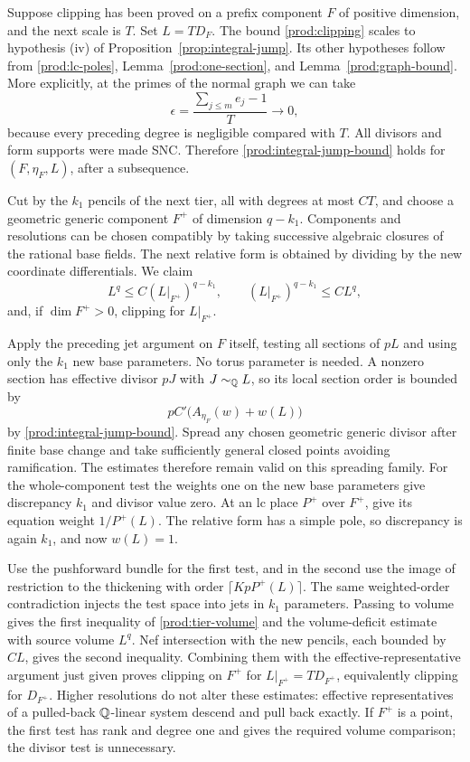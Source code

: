 Suppose clipping has been proved on a prefix component $F$ of positive
dimension, and the next scale is $T$.  Set $L=TD_F$.  The bound
\eqref{prod:clipping} scales to hypothesis (iv) of
Proposition~\ref{prop:integral-jump}.  Its other hypotheses follow from
\eqref{prod:lc-poles}, Lemma~\ref{prod:one-section}, and
Lemma~\ref{prod:graph-bound}.  More explicitly, at the primes of the
normal graph we can take
\[
 \epsilon=\frac{\sum_{j\leq m}e_j-1}{T}\longrightarrow0,
\]
because every preceding degree is negligible compared with $T$.
All divisors and form supports were made SNC.  Therefore
\eqref{prod:integral-jump-bound} holds for $(F,\eta_F,L)$, after a
subsequence.

Cut by the $k_1$ pencils of the next tier, all with degrees at most
$CT$, and choose a geometric generic component $F^+$ of dimension
$q-k_1$.  Components and resolutions can be chosen compatibly by
taking successive algebraic closures of the rational base fields.
The next relative form is obtained by dividing by the new coordinate
differentials.  We claim
\begin{equation}\label{prod:tier-volume}
 L^q\leq C(L|_{F^+})^{q-k_1},\qquad
 (L|_{F^+})^{q-k_1}\leq CL^q,
\end{equation}
and, if $\dim F^+>0$, clipping for $L|_{F^+}$.

Apply the preceding jet argument on $F$ itself, testing all sections
of $pL$ and using only the $k_1$ new base parameters.  No torus
parameter is needed.  A nonzero section has effective divisor $pJ$
with $J\sim_{\mathbb Q}L$, so its local section order is bounded by
\[
 pC'\bigl(A_{\eta_F}(w)+w(L)\bigr)
\]
by \eqref{prod:integral-jump-bound}.  Spread any chosen geometric
generic divisor after finite base change and take sufficiently general
closed points avoiding ramification.  The estimates therefore remain
valid on this spreading family.  For the whole-component test the
weights one on the new base parameters give discrepancy $k_1$ and
divisor value zero.  At an lc place $P^+$ over $F^+$, give its equation
weight $1/P^+(L)$.  The relative form has a simple pole, so discrepancy
is again $k_1$, and now $w(L)=1$.

Use the pushforward bundle for the first test, and in the second use
the image of restriction to the thickening with order
$\lceil KpP^+(L)\rceil$.  The same weighted-order contradiction injects
the test space into jets in $k_1$ parameters.  Passing to volume gives
the first inequality of \eqref{prod:tier-volume} and the volume-deficit
estimate with source volume $L^q$.  Nef intersection with the new
pencils, each bounded by $CL$, gives the second inequality.  Combining
them with the effective-representative argument just given proves
clipping on $F^+$ for $L|_{F^+}=TD_{F^+}$, equivalently clipping for
$D_{F^+}$.  Higher resolutions do not alter these estimates: effective
representatives of a pulled-back $\mathbb Q$-linear system descend and pull
back exactly.  If $F^+$ is a point, the first test has rank and degree
one and gives the required volume comparison; the divisor test is
unnecessary.

